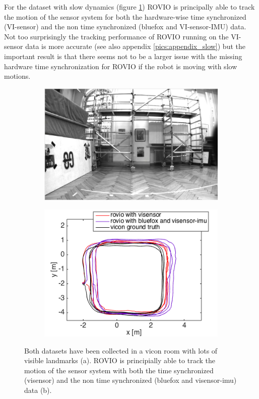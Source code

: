For the dataset with slow dynamics (figure \ref{pics:timesync_slow}) ROVIO is principally able to track the motion of the sensor system for both the hardware-wise time synchronized (VI-sensor) and the non time synchronized (bluefox and VI-sensor-IMU) data. Not too surprisingly the tracking performance of ROVIO running on the VI-sensor data is more accurate (see also appendix \ref{pics:appendix_slow}) but the important result is that there seems not to be a larger issue with the missing hardware time synchronization for ROVIO if the robot is moving with slow motions. \\

\begin{figure}
  \begin{subfigure}[b]{0.46\textwidth}
    \includegraphics[width=\textwidth]{images/slow.png}
    \caption{}
  \end{subfigure}
  \hfill
  \begin{subfigure}[b]{0.42\textwidth}
    \includegraphics[width=\textwidth]{images/slow_2D.png}
    \caption{}
  \end{subfigure}
   \caption{Both datasets have been collected in a vicon room with lots of visible landmarks (a). ROVIO is principially able to track the motion of the sensor system with both the time synchronized (visensor) and the non time synchronized (bluefox and visensor-imu) data (b).}
   \label{pics:timesync_slow}
\end{figure}

